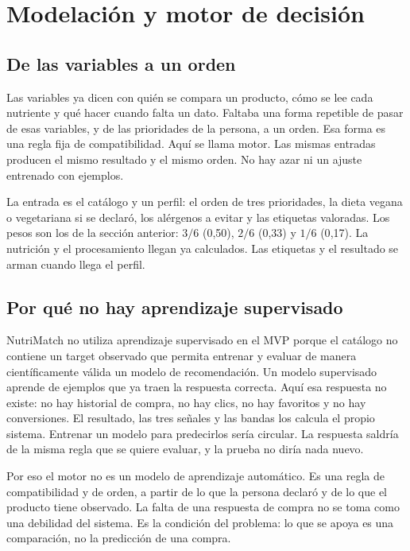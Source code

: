 \section{Modelación y motor de decisión}

\subsection{De las variables a un orden}

Las variables ya dicen con quién se compara un producto, cómo se lee cada nutriente y qué hacer cuando falta un dato. Faltaba una forma repetible de pasar de esas variables, y de las prioridades de la persona, a un orden. Esa forma es una regla fija de compatibilidad. Aquí se llama motor. Las mismas entradas producen el mismo resultado y el mismo orden. No hay azar ni un ajuste entrenado con ejemplos.

La entrada es el catálogo y un perfil: el orden de tres prioridades, la dieta vegana o vegetariana si se declaró, los alérgenos a evitar y las etiquetas valoradas. Los pesos son los de la sección anterior: \(3/6\) (0{,}50), \(2/6\) (0{,}33) y \(1/6\) (0{,}17). La nutrición y el procesamiento llegan ya calculados. Las etiquetas y el resultado se arman cuando llega el perfil.

\subsection{Por qué no hay aprendizaje supervisado}

NutriMatch no utiliza aprendizaje supervisado en el MVP porque el catálogo no contiene un target observado que permita entrenar y evaluar de manera científicamente válida un modelo de recomendación. Un modelo supervisado aprende de ejemplos que ya traen la respuesta correcta. Aquí esa respuesta no existe: no hay historial de compra, no hay clics, no hay favoritos y no hay conversiones. El resultado, las tres señales y las bandas los calcula el propio sistema. Entrenar un modelo para predecirlos sería circular. La respuesta saldría de la misma regla que se quiere evaluar, y la prueba no diría nada nuevo.

Por eso el motor no es un modelo de aprendizaje automático. Es una regla de compatibilidad y de orden, a partir de lo que la persona declaró y de lo que el producto tiene observado. La falta de una respuesta de compra no se toma como una debilidad del sistema. Es la condición del problema: lo que se apoya es una comparación, no la predicción de una compra.

